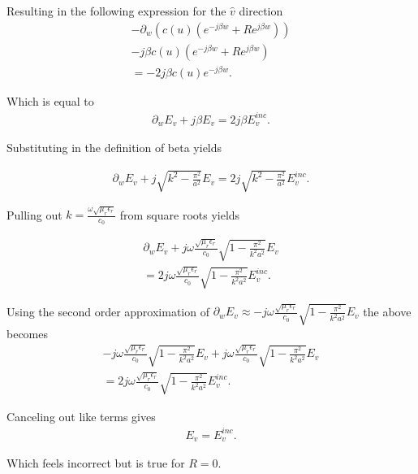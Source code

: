 Resulting in the following expression for the $\hat{v}$ direction
\begin{multline}
    -\partial_w(c(u)(e^{-j\beta w}+Re^{j\beta w})) \\ - j\beta c(u)(e^{-j\beta w}+Re^{j\beta w}) \\ =-2j\beta c(u)e^{-j\beta w}.
\end{multline}

Which is equal to
\begin{align}
    \partial_w E_v+j\beta E_v =2j\beta E_v^{inc}.
\end{align}

Substituting in the definition of beta yields

\begin{align}
    \partial_w E_v+j\sqrt{k^2-\frac{\pi^2}{a^2}} E_v =2j\sqrt{k^2-\frac{\pi^2}{a^2}} E_v^{inc}.
\end{align}

Pulling out $k=\frac{\omega\sqrt{\mu_r\epsilon_r}}{c_0}$ from square roots yields

\begin{multline}
    \partial_w E_v+j\omega\frac{\sqrt{\mu_r\epsilon_r}}{c_0}\sqrt{1-\frac{\pi^2}{k^2a^2}} E_v \\ =2j\omega\frac{\sqrt{\mu_r\epsilon_r}}{c_0}\sqrt{1-\frac{\pi^2}{k^2a^2}} E_v^{inc}.
\end{multline}

Using the second order approximation of $\partial_w E_v\approx-j\omega\frac{\sqrt{\mu_r\epsilon_r}}{c_0}\sqrt{1-\frac{\pi^2}{k^2a^2}}E_v$ the above becomes
\begin{multline}
    -j\omega\frac{\sqrt{\mu_r\epsilon_r}}{c_0}\sqrt{1-\frac{\pi^2}{k^2a^2}}E_v+j\omega\frac{\sqrt{\mu_r\epsilon_r}}{c_0}\sqrt{1-\frac{\pi^2}{k^2a^2}} E_v \\ =2j\omega\frac{\sqrt{\mu_r\epsilon_r}}{c_0}\sqrt{1-\frac{\pi^2}{k^2a^2}} E_v^{inc}.
\end{multline}

Canceling out like terms gives
\begin{align}
    E_v = E_v^{inc}.
\end{align}

Which feels incorrect but is true for $R=0$.